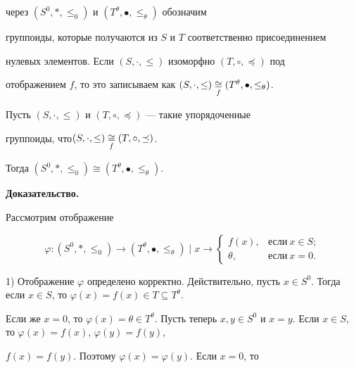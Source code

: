 через $(S^0,*,\le_0)$ и $(T^\theta,\bullet,\le_\theta)$ обозначим 


группоиды, которые получаются из $S$ и $T$ соответственно присоединением 


нулевых элементов. Если $(S,\cdot,\le)$ изоморфно $(T,\circ,\preceq)$ под 


отображением $f$, то это записываем как $(S,\cdot,\le)\down{f}{\cong} 


(T^\theta,\bullet,\le_\theta)$. 


 


\begin{prop} 


Пусть $(S,\cdot,\le)$ и $(T,\circ,\preceq)$ --- такие упорядоченные 


группоиды, что\linebreak $(S,\cdot,\le) \underset{f}{\cong}{} (T,\circ,\preceq)$.


Тогда $(S^0,*,\le_0)\cong (T^\theta,\bullet,\le_\theta)$. 


\end{prop} 


 


{\bf Доказательство.} 


Рассмотрим отображение 


$$ 


\varphi:(S^0,*,\le_0)\to (T^\theta,\bullet,\le_\theta)\mid x\to 


\begin{cases} 


f(x), & \text{если} \ x\in S; \\ 


\theta, & \text{если} \ x=0. 


\end{cases} 


$$ 


 


1) Отображение $\varphi$ определено корректно. Действительно, пусть $x\in 


S^0$. Тогда если $x\in S$, то $\varphi(x)=f(x)\in T\subseteq T^\theta$. 


Если же $x=0$, то $\varphi(x)=\theta\in T^\theta$. Пусть теперь $x,y\in 


S^0$ и $x=y$. Если $x\in S$, то $\varphi(x)=f(x)$, $\varphi(y)=f(y)$, 


$f(x)=f(y)$. Поэтому $\varphi(x)=\varphi(y)$. Если $x=0$, то 


